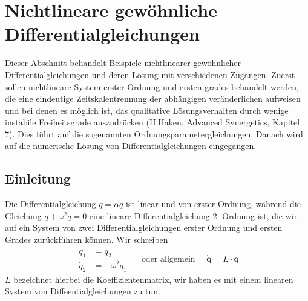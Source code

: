 \chapter{Nichtlineare gewöhnliche Differentialgleichungen}
Dieser Abschnitt behandelt Beispiele nichtlinearer gewöhnlicher
Differentialgleichungen und deren Lösung mit verschiedenen Zugängen. Zuerst
sollen nichtlineare System erster Ordnung und ersten grades behandelt werden,
die eine eindeutige Zeitskalentrennung der abhängigen veränderlichen aufweisen
und bei denen es möglich ist, das qualitative Lösungsverhalten durch wenige
instabile Freiheitsgrade auszudrücken ({\red H.Haken, Advanced Synergetics,
Kapitel 7}). Dies führt auf die sogenannten Ordnungsparametergleichungen.
Danach wird auf die numerische Lösung von Differentialgleichungen eingegangen.
\section{Einleitung}
Die Differentialgleichung $\dot q=\alpha q$ ist linear und von erster Ordnung,
während die Gleichung $\ddot q+\omega^2 q=0$ eine lineare Differentialgleichung
2. Ordnung ist, die wir auf ein System von zwei Differentialgleichungen erster
Ordnung und ersten Grades zurückführen können. Wir schreiben
\[
  \begin{matrix}\dot q_1&=q_2\\ \dot q_2&= -\omega^2 q_1 \end{matrix} 
  \quad\text{ oder allgemein }\quad\dot{\mathbf{q}}=L\cdot\mathbf{q}
\]
$L$ bezeichnet hierbei die Koeffizientenmatrix, wir haben es mit einem linearen
System von Diffeentialgleichungen zu tun.

